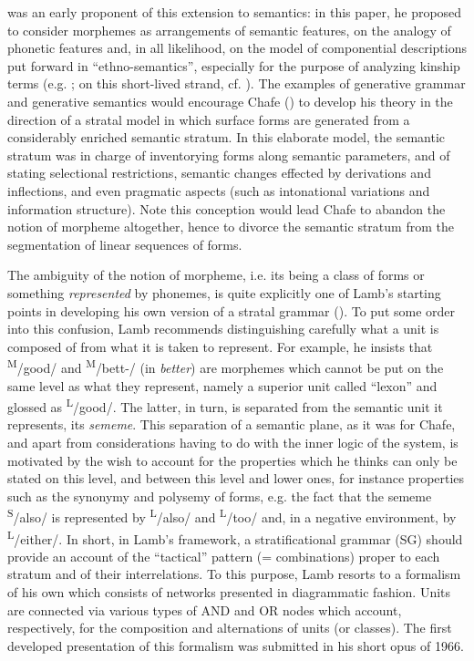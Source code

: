 \documentclass[output=paper]{langscibook}
\begin{document}
\citet{chafe_phonetics_1962} was an early proponent of this extension to semantics: in this paper, he proposed to consider morphemes as arrangements of semantic features, on the analogy of phonetic features and, in all likelihood, on the model of componential descriptions put forward in “ethno-semantics”, especially for the purpose of analyzing kinship terms (e.g. \citealt{lounsbury_semantic_1956}; on this short-lived strand, cf. \citealt{murray_dissolution_1982}). The examples of generative grammar and generative semantics would encourage Chafe (\citealt{chafe_meaning_1970}) to develop his theory in the direction of a stratal model in which surface forms are generated from a considerably enriched semantic stratum. In this elaborate model, the semantic stratum was in charge of inventorying forms along semantic parameters, and of stating selectional restrictions, semantic changes effected by derivations and inflections, and even pragmatic aspects (such as intonational variations and information structure). Note this conception would lead Chafe to abandon the notion of morpheme altogether, hence to divorce the semantic stratum from the segmentation of linear sequences of forms.

The ambiguity of the notion of morpheme, i.e. its being a class of forms or something \textit{represented} by phonemes, is quite explicitly one of Lamb’s starting points in developing his own version of a stratal grammar (\citealt{lamb_sememic_1964}). To put some order into this confusion, Lamb recommends distinguishing carefully what a unit is composed of from what it is taken to represent. For example, he insists that \textsuperscript{M}/good/ and \textsuperscript{M}/bett-/ (in \textit{better}) are morphemes which cannot be put on the same level as what they represent, namely a superior unit called “lexon” and glossed as \textsuperscript{L}/good/. The latter, in turn, is separated from the semantic unit it represents, its \textit{sememe}. This separation of a semantic plane, as it was for Chafe, and apart from considerations having to do with the inner logic of the system, is motivated by the wish to account for the properties which he thinks can only be stated on this level, and between this level and lower ones, for instance properties such as the synonymy and polysemy of forms, e.g. the fact that the sememe \textsuperscript{S}/also/ is represented by \textsuperscript{L}/also/ and \textsuperscript{L}/too/ and, in a negative environment, by \textsuperscript{L}/either/. In short, in Lamb’s framework, a stratificational grammar (SG) should provide an account of the “tactical” pattern (= combinations) proper to each stratum and of their interrelations. To this purpose, Lamb resorts to a formalism of his own which consists of networks presented in diagrammatic fashion. Units are connected via various types of AND and OR nodes which account, respectively, for the composition and alternations of units (or classes). The first developed presentation of this formalism was submitted in his short opus of 1966.
\end{document}
